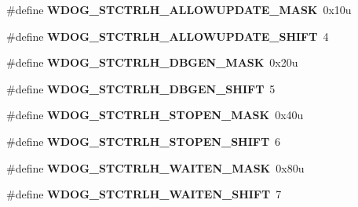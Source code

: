 \begin{DoxyCompactItemize}
\item 
\#define {\bfseries W\+D\+O\+G\+\_\+\+S\+T\+C\+T\+R\+L\+H\+\_\+\+A\+L\+L\+O\+W\+U\+P\+D\+A\+T\+E\+\_\+\+M\+A\+SK}~0x10u\hypertarget{group__WDOG__Register__Masks_gaf524a1ad1f811741b27f29836d6137ee}{}\label{group__WDOG__Register__Masks_gaf524a1ad1f811741b27f29836d6137ee}

\item 
\#define {\bfseries W\+D\+O\+G\+\_\+\+S\+T\+C\+T\+R\+L\+H\+\_\+\+A\+L\+L\+O\+W\+U\+P\+D\+A\+T\+E\+\_\+\+S\+H\+I\+FT}~4\hypertarget{group__WDOG__Register__Masks_gaf2ae60bccb334321f860b2480d916604}{}\label{group__WDOG__Register__Masks_gaf2ae60bccb334321f860b2480d916604}

\item 
\#define {\bfseries W\+D\+O\+G\+\_\+\+S\+T\+C\+T\+R\+L\+H\+\_\+\+D\+B\+G\+E\+N\+\_\+\+M\+A\+SK}~0x20u\hypertarget{group__WDOG__Register__Masks_ga837911a61f223e74ea90cca76f08a787}{}\label{group__WDOG__Register__Masks_ga837911a61f223e74ea90cca76f08a787}

\item 
\#define {\bfseries W\+D\+O\+G\+\_\+\+S\+T\+C\+T\+R\+L\+H\+\_\+\+D\+B\+G\+E\+N\+\_\+\+S\+H\+I\+FT}~5\hypertarget{group__WDOG__Register__Masks_ga9fdcaa733bd0393d4bce730c1d2c90c5}{}\label{group__WDOG__Register__Masks_ga9fdcaa733bd0393d4bce730c1d2c90c5}

\item 
\#define {\bfseries W\+D\+O\+G\+\_\+\+S\+T\+C\+T\+R\+L\+H\+\_\+\+S\+T\+O\+P\+E\+N\+\_\+\+M\+A\+SK}~0x40u\hypertarget{group__WDOG__Register__Masks_gab78af949041ea10c257c8276c8e2782a}{}\label{group__WDOG__Register__Masks_gab78af949041ea10c257c8276c8e2782a}

\item 
\#define {\bfseries W\+D\+O\+G\+\_\+\+S\+T\+C\+T\+R\+L\+H\+\_\+\+S\+T\+O\+P\+E\+N\+\_\+\+S\+H\+I\+FT}~6\hypertarget{group__WDOG__Register__Masks_ga46b2b7b0c6a5938cfa26d96ba332d5d0}{}\label{group__WDOG__Register__Masks_ga46b2b7b0c6a5938cfa26d96ba332d5d0}

\item 
\#define {\bfseries W\+D\+O\+G\+\_\+\+S\+T\+C\+T\+R\+L\+H\+\_\+\+W\+A\+I\+T\+E\+N\+\_\+\+M\+A\+SK}~0x80u\hypertarget{group__WDOG__Register__Masks_gad6e2dd88be51a78f133085bb0df3a5f9}{}\label{group__WDOG__Register__Masks_gad6e2dd88be51a78f133085bb0df3a5f9}

\item 
\#define {\bfseries W\+D\+O\+G\+\_\+\+S\+T\+C\+T\+R\+L\+H\+\_\+\+W\+A\+I\+T\+E\+N\+\_\+\+S\+H\+I\+FT}~7\hypertarget{group__WDOG__Register__Masks_gad224b313777fd019f8ec46f1791a52b7}{}\label{group__WDOG__Register__Masks_gad224b313777fd019f8ec46f1791a52b7}


\end{DoxyCompactItemize}
